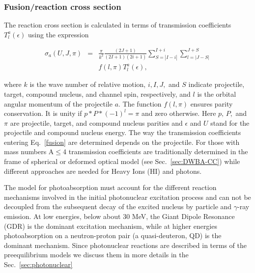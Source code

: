 \documentclass[twocolumn,amsmath,amssymb,10pt,groupedaddress,a4paper]{revtex4}
\begin{document}
\subsubsection{Fusion/reaction cross section\label{sec: fusion}}
The reaction cross section is calculated in terms of transmission
coefficients $T_{l}^{a}(\epsilon)$ using the expression

\begin{eqnarray}
\sigma_{a}(U,J,\pi)&=&\frac{\pi}{k^{2}}\frac{(2J+1)}{(2I+1)(2i+1)}\sum_{S=|I-i|}^{I+i}\sum_{l=|J-S|}^{J+S}\nonumber\\
                   & &f(l,\pi)T_{l}^{a}(\epsilon),
\label{fusion}
\end{eqnarray}

\noindent where $k$ is the wave number of relative motion, $i,I,J,$
and $S$ indicate projectile, target, compound nucleus, and channel
spin, respectively, and $l$ is the orbital angular momentum of the
projectile $a$. The function $f(l,\pi)$ ensures parity conservation.
It is unity if $p*P*(-1)^{l}=\pi$ and zero otherwise. Here $p,\, P,$
and $\pi$ are projectile, target, and compound nucleus parities and
$\epsilon$ and $U$ stand for the projectile and compound nucleus
energy. The way the transmission coefficients entering Eq.~\ref{fusion}
are determined depends on the projectile. For those with mass numbers
A$\leq$4 transmission coefficients are traditionally determined in the frame of
spherical or deformed optical model (see Sec.~\ref{sec:DWBA-CC})
while different approaches are needed for Heavy Ions (HI) and photons.

The model for photoabsorption must account for the different reaction
mechanisms involved in the initial photonuclear excitation process
and can not be decoupled from the
subsequent decay of the excited nucleus by particle and $\gamma$-ray
emission. At low energies, below about 30 MeV, the Giant Dipole Resonance
(GDR) is the dominant excitation mechanism, while at higher
energies photoabsorption on a neutron-proton
pair (a quasi-deuteron, QD) is the dominant mechanism. Since photonuclear
reactions are described in terms of the preequilibrium models we discuss
them in more details in the Sec.~\ref{sec:photonuclear}
\end{document}
